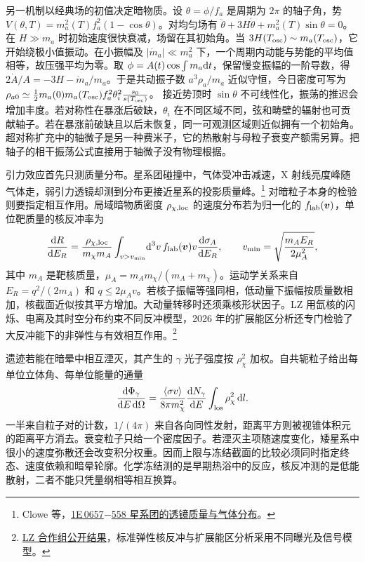 另一机制以经典场的初值决定暗物质。设 $\theta=\phi/f_a$ 是周期为 $2\pi$ 的轴子角，势 $V(\theta,T)=m_a^2(T)f_a^2(1-\cos\theta)$。对均匀场有 $\ddot\theta+3H\dot\theta+m_a^2(T)\sin\theta=0$。在 $H\gg m_a$ 时初始速度很快衰减，场留在其初始角。当 $3H(T_{\rm osc})\sim m_a(T_{\rm osc})$，它开始绕极小值振动。在小振幅及 $|\dot m_a|\ll m_a^2$ 下，一个周期内动能与势能的平均值相等，故压强平均为零。取 $\phi=A(t)\cos\int m_a\dd t$，保留慢变振幅的一阶导数，得 $2\dot A/A=-3H-\dot m_a/m_a$。于是共动振子数 $a^3\rho_a/m_a$ 近似守恒，今日密度可写为 $\rho_{a0}\simeq\allowbreak{}\frac12 m_a(0)m_a(T_{\rm osc})f_a^2\theta_i^2 \frac{s_0}{s(T_{\rm osc})}$。
接近势顶时 $\sin\theta$ 不可线性化，振荡的推迟会增加丰度。若对称性在暴涨后破缺，$\theta_i$ 在不同区域不同，弦和畴壁的辐射也可贡献轴子。若在暴涨前破缺且以后未恢复，同一可观测区域则近似拥有一个初始角。超对称扩充中的轴微子是另一种费米子，它的热散射与母粒子衰变产额需另算。把轴子的相干振荡公式直接用于轴微子没有物理根据。

引力效应首先只测质量分布。星系团碰撞中，气体受冲击减速，X 射线亮度峰随气体走，弱引力透镜却测到分布更接近星系的投影质量峰。\footnote{Clowe 等，\href{https://arxiv.org/abs/astro-ph/0608407}{1E\,0657$-$558 星系团的透镜质量与气体分布}。} 对暗粒子本身的检验则要指定相互作用。局域暗物质密度 $\rho_{\chi,{\rm loc}}$ 的速度分布若为归一化的 $f_{\rm lab}(\bm v)$，单位靶质量的核反冲率为
\[
 \frac{\dd R}{\dd E_R}=
 \frac{\rho_{\chi,{\rm loc}}}{m_\chi m_A}
 \int_{v>v_{\min}}\!\dd^3v\, f_{\rm lab}(\bm v)v
 \frac{\dd\sigma_A}{\dd E_R},\qquad
 v_{\min}=\sqrt{\frac{m_A E_R}{2\mu_A^2}},
\]
其中 $m_A$ 是靶核质量，$\mu_A=m_A m_\chi/(m_A+m_\chi)$。运动学关系来自 $E_R=q^2/(2m_A)$ 和 $q\leq2\mu_A v$。若核子振幅等强同相，低动量下振幅按质量数相加，核截面近似按其平方增加。大动量转移时还须乘核形状因子。LZ 用氙核的闪烁、电离及其时空分布约束不同反冲模型，2026 年的扩展能区分析还专门检验了大反冲能下的非弹性与有效相互作用。\footnote{\href{https://lz.lbl.gov/}{LZ 合作组公开结果}，标准弹性核反冲与扩展能区分析采用不同曝光及信号模型。}

遗迹若能在暗晕中相互湮灭，其产生的 $\gamma$ 光子强度按 $\rho_\chi^2$ 加权。自共轭粒子给出每单位立体角、每单位能量的通量
\[
 \frac{\dd\Phi_\gamma}{\dd E\,\dd\Omega}=
 \frac{\langle\sigma v\rangle}{8\pi m_\chi^2}
 \frac{\dd N_\gamma}{\dd E}\int_{\rm los}\rho_\chi^2\,\dd l .
\]
一半来自粒子对的计数，$1/(4\pi)$ 来自各向同性发射，距离平方则被视锥体积元的距离平方消去。衰变粒子只给一个密度因子。若湮灭主项随速度变化，矮星系中很小的速度弥散还会改变积分权重。因而上限与冻结截面的比较必须同时指定终态、速度依赖和暗晕轮廓。化学冻结测的是早期热浴中的反应，核反冲测的是低能散射，二者不能只凭量纲相等相互换算。


